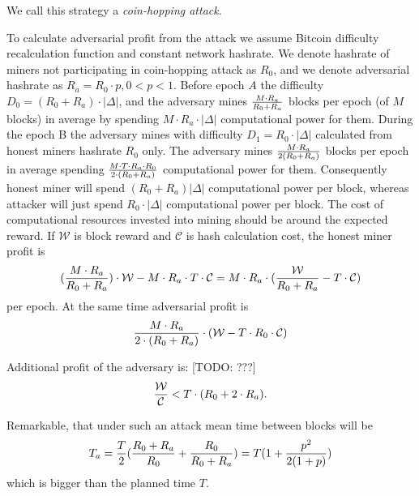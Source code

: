 \documentclass[]{llncs}
\newcommand{\texp}{|\Delta|}
\newcommand{\reward}{\mathcal{W}}
\newcommand{\cost}{\mathcal{C}}
\newcommand{\attackname}{coin-hopping attack}
\begin{document}
We call this strategy a \textit{\attackname}.

To calculate adversarial profit from the attack we assume Bitcoin difficulty recalculation function and constant network hashrate. We denote hashrate of miners not participating in coin-hopping attack as $R_0$, and we denote adversarial hashrate as $R_a=R_0\cdot p, 0 < p < 1 $.
Before epoch $A$ the difficulty $D_0 = (R_0+R_a) \cdot \texp$, and the adversary mines $M \cdot R_a \over R_0 + R_a$ blocks per epoch (of $M$ blocks) in average by spending $M \cdot R_a \cdot \texp$ computational power for them.
During the epoch B the adversary mines with difficulty $D_1 = R_0 \cdot \texp$ calculated from honest miners hashrate $R_0$ only.
The adversary mines $M \cdot R_a \over 2(R_0+ R_a)$ blocks per epoch in average spending $M\cdot T\cdot R_a\cdot R_0\over 2 \cdot (R_0+R_a)$ computational power for them.
Consequently honest miner will spend $(R_0+R_a) \texp$ computational power per block, whereas attacker will just spend $R_0 \cdot \texp$ computational power per block.
The cost of computational resources invested into mining should be around the expected reward.
If $\reward$ is block reward and $\cost$ is hash calculation cost, the honest miner profit is
\begin{equation}
{({M \cdot R_a \over R_0 + R_a}) \cdot \reward - M \cdot R_a \cdot T \cdot \cost = M\cdot R_a\cdot ({\reward \over R_0+R_a}-T \cdot \cost)}
\end{equation}
per epoch.
At the same time adversarial profit is
\begin{equation}
{{M\cdot R_a \over 2\cdot (R_0+R_a)}\cdot (\reward - T\cdot R_0\cdot \cost)}
\end{equation}


Additional profit of the adversary is:
[TODO: ???]
\begin{equation}
{{\reward \over \cost} < T \cdot (R_0 + 2 \cdot R_a)}.
\end{equation}



Remarkable, that under such an attack mean time between blocks will be
\begin{equation}
\label{eq:ati}
{T_a={T\over 2}({R_0+R_a\over R_0} + {R_0 \over R_0+R_a}) = T(1 + {p^2\over 2(1+p)})}
\end{equation}
which is bigger than the planned time $T$.

\end{document}
